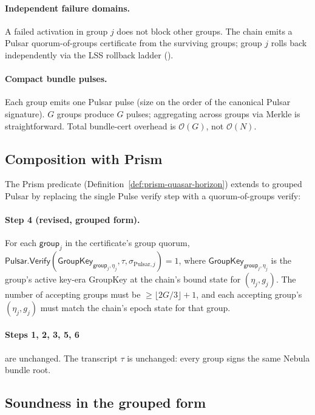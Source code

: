 \paragraph{Independent failure domains.} A failed activation in group $j$ does not block other groups. The chain emits a Pulsar quorum-of-groups certificate from the surviving groups; group $j$ rolls back independently via the LSS rollback ladder (\cite{luxlssmpc,lp077}).

\paragraph{Compact bundle pulses.} Each group emits one Pulsar pulse (size on the order of the canonical Pulsar signature). $G$ groups produce $G$ pulses; aggregating across groups via Merkle is straightforward. Total bundle-cert overhead is $\mathcal{O}(G)$, not $\mathcal{O}(N)$.

\subsection{Composition with Prism}

The Prism predicate (Definition~\ref{def:prism-quasar-horizon}) extends to grouped Pulsar by replacing the single Pulse verify step with a quorum-of-groups verify:

\paragraph{Step 4 (revised, grouped form).} For each $\mathsf{group}_j$ in the certificate's group quorum, $\mathsf{Pulsar.Verify}(\mathsf{GroupKey}_{\mathsf{group}_j, \eta_j}, \tau, \sigma_{\mathrm{Pulsar},j}) = 1$, where $\mathsf{GroupKey}_{\mathsf{group}_j, \eta_j}$ is the group's active key-era GroupKey at the chain's bound state for $(\eta_j, g_j)$. The number of accepting groups must be $\geq \lfloor 2G/3 \rfloor + 1$, and each accepting group's $(\eta_j, g_j)$ must match the chain's epoch state for that group.

\paragraph{Steps 1, 2, 3, 5, 6} are unchanged. The transcript $\tau$ is unchanged: every group signs the same Nebula bundle root.

\subsection{Soundness in the grouped form}

